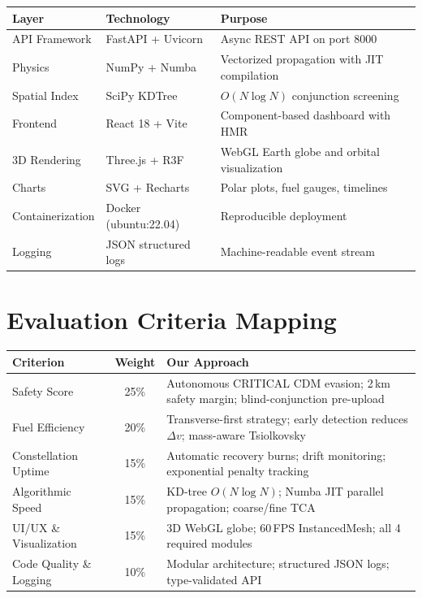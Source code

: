 \documentclass[11pt, a4paper]{article}
\begin{document}
\begin{table}[H]
\centering
\begin{tabularx}{\textwidth}{l l X}
\toprule
\textbf{Layer} & \textbf{Technology} & \textbf{Purpose} \\
\midrule
API Framework & FastAPI + Uvicorn & Async REST API on port 8000 \\
Physics & NumPy + Numba & Vectorized propagation with JIT compilation \\
Spatial Index & SciPy KDTree & $O(N\log N)$ conjunction screening \\
Frontend & React 18 + Vite & Component-based dashboard with HMR \\
3D Rendering & Three.js + R3F & WebGL Earth globe and orbital visualization \\
Charts & SVG + Recharts & Polar plots, fuel gauges, timelines \\
Containerization & Docker (ubuntu:22.04) & Reproducible deployment \\
Logging & JSON structured logs & Machine-readable event stream \\
\bottomrule
\end{tabularx}
\end{table}

\section{Evaluation Criteria Mapping}

\begin{table}[H]
\centering
\begin{tabularx}{\textwidth}{l c X}
\toprule
\textbf{Criterion} & \textbf{Weight} & \textbf{Our Approach} \\
\midrule
Safety Score & 25\% & Autonomous CRITICAL CDM evasion; 2\,km safety margin; blind-conjunction pre-upload \\
Fuel Efficiency & 20\% & Transverse-first strategy; early detection reduces $\Delta v$; mass-aware Tsiolkovsky \\
Constellation Uptime & 15\% & Automatic recovery burns; drift monitoring; exponential penalty tracking \\
Algorithmic Speed & 15\% & KD-tree $O(N\log N)$; Numba JIT parallel propagation; coarse/fine TCA \\
UI/UX \& Visualization & 15\% & 3D WebGL globe; 60\,FPS InstancedMesh; all 4 required modules \\
Code Quality \& Logging & 10\% & Modular architecture; structured JSON logs; type-validated API \\
\bottomrule
\end{tabularx}
\end{table}
\end{document}
